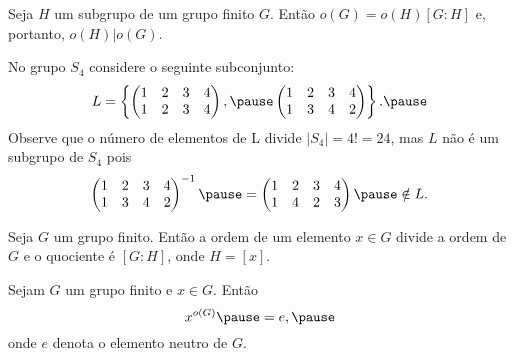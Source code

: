 \documentclass{beamer}
\begin{document}
    \begin{frame}
        \begin{teorema}
            Seja $H$ um subgrupo \pause de um grupo finito $G$. \pause Então $o(G) = o(H)[G:H]$ \pause e, portanto, $o(H) | o(G)$.
        \end{teorema}
    \end{frame}

    \begin{frame}
        \begin{observacao}
            No grupo $S_4$ \pause considere o seguinte subconjunto: \pause
            \[
                L = \left\{\begin{pmatrix}
                    1 & 2 & 3 & 4\\
                    1 & 2 & 3 & 4
                \end{pmatrix}, \pause \begin{pmatrix}
                    1 & 2 & 3 & 4\\
                    1 & 3 & 4 & 2
                \end{pmatrix}\right\}. \pause
            \]
            Observe que o número de elementos de L \pause divide $|S_4| = 4! = 24$, \pause mas $L$ não é um subgrupo de $S_4$ \pause pois
            \[
                \begin{pmatrix}
                    1 & 2 & 3 & 4\\
                    1 & 3 & 4 & 2
                \end{pmatrix}^{-1} \pause = \begin{pmatrix}
                    1 & 2 & 3 & 4\\
                    1 & 4 & 2 & 3
                \end{pmatrix} \pause \notin L.
            \]
        \end{observacao}
    \end{frame}

    \begin{frame}
        \begin{corolario}
            Seja $G$ um grupo finito. \pause Então a ordem de um elemento $x \in G$ \pause divide a ordem de $G$ \pause e o quociente é $[G : H]$, \pause onde $H = [x]$.
        \end{corolario}
    \end{frame}

    \begin{frame}
        \begin{corolario}
            Sejam $G$ um grupo finito \pause e $x \in G$. \pause Então
            \[
                x^{o(G)} \pause = e, \pause
            \]
            onde $e$ denota o elemento neutro de $G$.
        \end{corolario}
    \end{frame}
\end{document}
